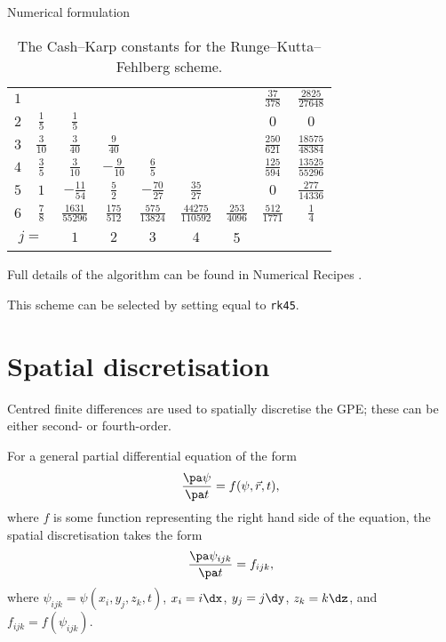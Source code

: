 \begin{chapter}{\label{cha:numerics}Numerical formulation}
\begin{table}
\begin{tabular}{|c|c|ccccc|c|c|}
      \hline
      $1$ & & & & & & & $\frac{37}{378}$ & $\frac{2825}{27648}$ \\
      $2$ & $\frac{1}{5}$ & $\frac{1}{5}$ & & & & & $0$ & $0$ \\
      $3$ & $\frac{3}{10}$ & $\frac{3}{40}$ & $\frac{9}{40}$ & & & & $\frac{250}{621}$ & $\frac{18575}{48384}$ \\
      $4$ & $\frac{3}{5}$ & $\frac{3}{10}$ & $-\frac{9}{10}$ & $\frac{6}{5}$ & & & $\frac{125}{594}$ & $\frac{13525}{55296}$ \\
      $5$ & $1$ & $-\frac{11}{54}$ & $\frac{5}{2}$ & $-\frac{70}{27}$ & $\frac{35}{27}$ & & $0$ & $\frac{277}{14336}$ \\
      $6$ & $\frac{7}{8}$ & $\frac{1631}{55296}$ & $\frac{175}{512}$ & $\frac{575}{13824}$ & $\frac{44275}{110592}$ & $\frac{253}{4096}$ & $\frac{512}{1771}$ & $\frac{1}{4}$ \\
      \hline
      \multicolumn{2}{|c}{$j=$} & $1$ & $2$ & $3$ & $4$ & \multicolumn{1}{c}{5} & \multicolumn{2}{c|}{} \\
      \hline
    \end{tabular}
    \caption{\label{tab:cash_karp}The Cash--Karp constants for the
      Runge--Kutta--Fehlberg scheme.}
  \end{table}
  Full details of the algorithm can be found in Numerical Recipes \citep[\S
  16.2, p.708,][]{NR92}.

  This scheme can be selected by setting  equal to \verb"rk45".

  \section{Spatial discretisation}
  Centred finite differences are used to spatially discretise the GPE; these
  can be either second- or fourth-order.

  For a general partial differential equation of the form
  \begin{equation*}
    \frac{\pa \psi}{\pa t} = f(\psi, \vec{r}, t),
  \end{equation*}
  where $f$ is some function representing the right hand side of the equation,
  the spatial discretisation takes the form
  \begin{equation*}
    \frac{\pa \psi_{ijk}}{\pa t} = f_{ijk},
  \end{equation*}
  where $\psi_{ijk} = \psi\left( x_{i}, y_{j}, z_{k}, t \right)$, $x_{i} =
  i\dx$, $y_{j} = j\dy$, $z_{k} = k\dz$, and $f_{ijk} = f\left( \psi_{ijk}
  \right)$.


\end{chapter}
